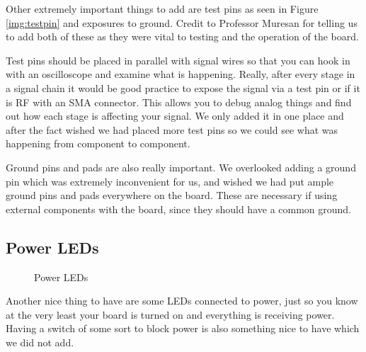 Other extremely important things to add are test pins as seen in Figure \ref{img:testpin} and exposures to ground. Credit to
Professor Muresan for telling us to add both of these as they were vital to testing and the operation of the board.

Test pins should be placed in parallel with signal wires so that you can hook in with an oscilloscope and examine what is happening.
Really, after every stage in a signal chain it would be good practice to expose the signal via a test pin or if it is RF with an
SMA connector. This allows you to debug analog things and find out how each stage is affecting your signal. We only added it
in one place and after the fact wished we had placed more test pins so we could see what was happening from component to component.

Ground pins and pads are also really important. We overlooked adding a ground pin which was extremely inconvenient for us, and wished we
had put ample ground pins and pads everywhere on the board. These are necessary if using external components with the board, since
they should have a common ground.

\subsection{Power LEDs}
\begin{figure}[H]
  \centering
\caption{Power LEDs}
\label{img:led}
\end{figure}

Another nice thing to have are some LEDs connected to power, just so you know at the very least your board is turned on and everything
is receiving power. Having a switch of some sort to block power is also something nice to have which we did not add.

